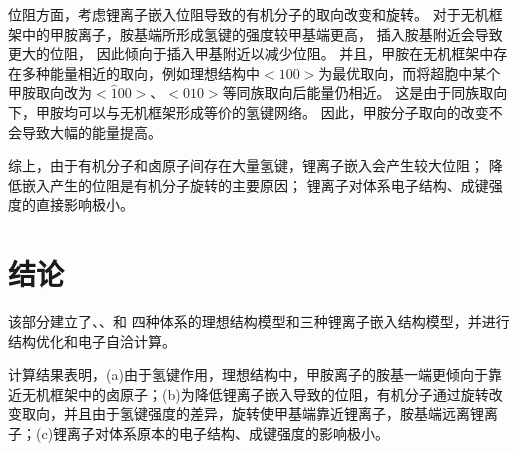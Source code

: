 位阻方面，考虑锂离子嵌入位阻导致的有机分子的取向改变和旋转。
对于无机框架中的甲胺离子，胺基端所形成氢键的强度较甲基端更高，  插入胺基附近会导致更大的位阻， 因此倾向于插入甲基附近以减少位阻。
并且，甲胺在无机框架中存在多种能量相近的取向，例如理想结构中$<100>$为最优取向，而将超胞中某个甲胺取向改为$<\hat{1}00>$、$<010>$等同族取向后能量仍相近。
这是由于同族取向下，甲胺均可以与无机框架形成等价的氢键网络。
因此，甲胺分子取向的改变不会导致大幅的能量提高。

综上，由于有机分子和卤原子间存在大量氢键，锂离子嵌入会产生较大位阻；
降低嵌入产生的位阻是有机分子旋转的主要原因；
锂离子对体系电子结构、成键强度的直接影响极小。

\section{结论}

该部分建立了、、和 四种体系的理想结构模型和三种锂离子嵌入结构模型，并进行结构优化和电子自洽计算。

计算结果表明，(a)由于氢键作用，理想结构中，甲胺离子的胺基一端更倾向于靠近无机框架中的卤原子；(b)为降低锂离子嵌入导致的位阻，有机分子通过旋转改变取向，并且由于氢键强度的差异，旋转使甲基端靠近锂离子，胺基端远离锂离子；(c)锂离子对体系原本的电子结构、成键强度的影响极小。

